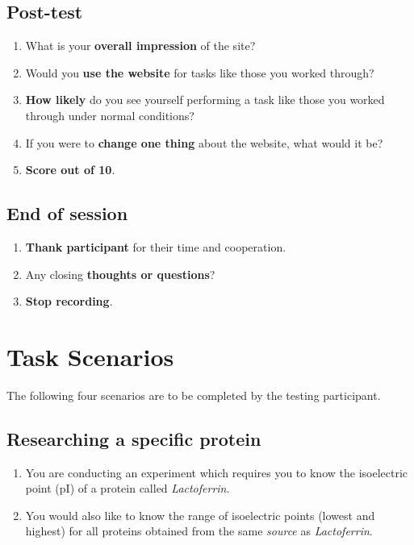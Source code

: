 \documentclass[12pt,twoside]{report}
\begin{document}
\section{Post-test}
\begin{enumerate}
\item What is your \textbf{overall impression} of the site?
\item Would you \textbf{use the website} for tasks like those you
  worked through?
\item \textbf{How likely} do you see yourself performing a task like
  those you worked through under normal conditions?
\item If you were to \textbf{change one thing} about the website, what
  would it be?
\item \textbf{Score out of 10}.
\end{enumerate}

\section{End of session}
\begin{enumerate}
\item \textbf{Thank participant} for their time and cooperation.
\item Any closing \textbf{thoughts or questions}?
\item \textbf{Stop recording}.
\end{enumerate}

\chapter{Task Scenarios}

The following four scenarios are to be completed by the testing
participant.

\section{Researching a specific protein}
\begin{enumerate}
\item You are conducting an experiment which requires you to know the
  isoelectric point (pI) of a protein called \textit{Lactoferrin}.
\item You would also like to know the range of isoelectric points
  (lowest and highest) for all proteins obtained from the same
  \textit{source} as \textit{Lactoferrin}.
\end{enumerate}
\end{document}
